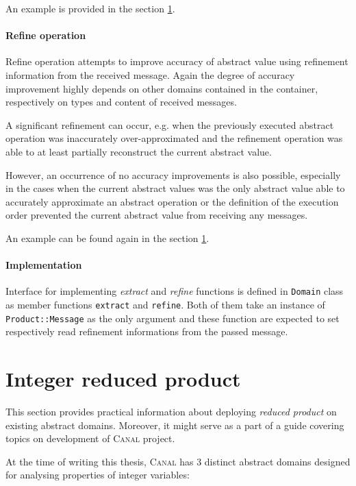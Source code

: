 \documentclass[12pt,oneside]{fithesis2}
\theoremstyle{definition}
\begin{document}
An example is provided in the section \ref{sec:integer-reduced-product}.

\paragraph{Refine operation}
Refine operation attempts to improve accuracy of abstract value using refinement information from the received message. Again the degree of accuracy improvement highly depends on other domains contained in the container, respectively on types and content of received messages.

A significant refinement can occur, e.g. when the previously executed abstract operation was inaccurately over-approximated and the refinement operation was able to at least partially reconstruct the current abstract value.

However, an occurrence of no accuracy improvements is also possible, especially in the cases when the current abstract values was the only abstract value able to accurately approximate an abstract operation or the definition of the execution order prevented the current abstract value from receiving any messages.

An example can be found again in the section \ref{sec:integer-reduced-product}.

\paragraph{Implementation}
Interface for implementing \textit{extract} and \textit{refine} functions is defined in \texttt{Domain} class as member functions \texttt{extract} and \texttt{refine}. Both of them take an instance of \texttt{Product::Message} as the only argument and these function are expected to set respectively read refinement informations from the passed message.

\section{Integer reduced product}\label{sec:integer-reduced-product}

This section provides practical information about deploying \textit{reduced product} on existing abstract domains. Moreover, it might serve as a part of a guide covering topics on development of \textsc{Canal} project.

At the time of writing this thesis, \textsc{Canal} has 3 distinct abstract domains designed for analysing properties of integer variables:
\end{document}
